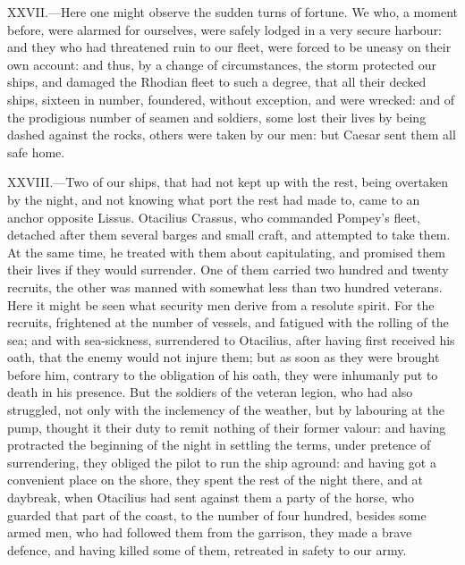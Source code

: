 XXVII.—Here one might observe the sudden turns of fortune. We who, a
moment before, were alarmed for ourselves, were safely lodged in a very
secure harbour: and they who had threatened ruin to our fleet, were
forced to be uneasy on their own account: and thus, by a change of
circumstances, the storm protected our ships, and damaged the Rhodian
fleet to such a degree, that all their decked ships, sixteen in number,
foundered, without exception, and were wrecked: and of the prodigious
number of seamen and soldiers, some lost their lives by being dashed
against the rocks, others were taken by our men: but Caesar sent them
all safe home.

XXVIII.—Two of our ships, that had not kept up with the rest, being
overtaken by the night, and not knowing what port the rest had made to,
came to an anchor opposite Lissus. Otacilius Crassus, who commanded
Pompey's fleet, detached after them several barges and small craft, and
attempted to take them. At the same time, he treated with them about
capitulating, and promised them their lives if they would surrender. One
of them carried two hundred and twenty recruits, the other was manned
with somewhat less than two hundred veterans. Here it might be seen what
security men derive from a resolute spirit. For the recruits, frightened
at the number of vessels, and fatigued with the rolling of the sea; and
with sea-sickness, surrendered to Otacilius, after having first received
his oath, that the enemy would not injure them; but as soon as they were
brought before him, contrary to the obligation of his oath, they were
inhumanly put to death in his presence. But the soldiers of the veteran
legion, who had also struggled, not only with the inclemency of the
weather, but by labouring at the pump, thought it their duty to remit
nothing of their former valour: and having protracted the beginning of
the night in settling the terms, under pretence of surrendering, they
obliged the pilot to run the ship aground: and having got a convenient
place on the shore, they spent the rest of the night there, and at
daybreak, when Otacilius had sent against them a party of the horse, who
guarded that part of the coast, to the number of four hundred, besides
some armed men, who had followed them from the garrison, they made a
brave defence, and having killed some of them, retreated in safety to
our army.


